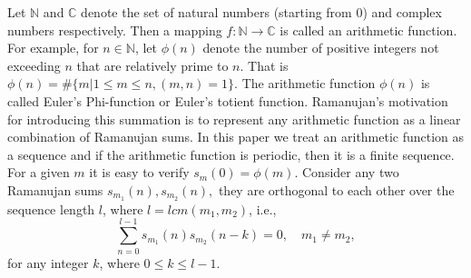 \documentclass[conference]{IEEEtran}
\begin{document}
Let $\mathbb{N}$ and $\mathbb{C}$ denote the set of natural numbers (starting from $0$) and complex numbers respectively. Then a mapping 
$f:\mathbb{N}\to \mathbb{C}$ is called an arithmetic function. For example, for 
$n \in \mathbb{N}$, let $\phi(n)$ denote the number of positive integers not exceeding $n$
that are relatively prime to $n$. That is 
$\phi(n)=\#\{m|1\leq m\leq n, (m,n)=1\}.$  The arithmetic function $\phi(n)$ is called Euler's Phi-function or Euler's totient function.
Ramanujan's motivation for introducing this summation is to represent any arithmetic function as a linear combination of Ramanujan sums. In this paper we treat an arithmetic function as a sequence and if the arithmetic function is periodic, then it is a finite sequence.
For a given $m$ it is easy to verify $s_m(0) = \phi(m)$. Consider any two Ramanujan sums $s_{m_1}(n),s_{m_2}(n),$ they are orthogonal to each other over the sequence length $l$, where $l = lcm(m_1,m_2)$, i.e.,
\begin{equation}
\label{eq3}
\sum_{n=0}^{l-1}s_{m_1}(n)s_{m_2}(n-k) = 0,{\quad} {m_1}\neq{m_2},
\end{equation} for any integer $k$, where $0\leq k \leq {l-1}$.
 
\end{document}
